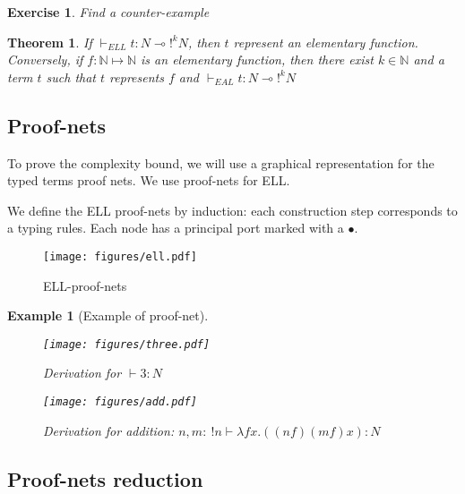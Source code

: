 \documentclass[a4paper,10pt]{article}
\newcommand{\limpl}{\multimap}  %
\newcommand{\Nset}{\mathbb{N}} %
\newtheorem{thm}{Theorem}
\newtheorem{ex}{Example}
\newtheorem{exo}{Exercise}
\begin{document}
\begin{exo}
Find a counter-example
\end{exo}

\begin{thm}
If $\vdash_{ELL} t:N \limpl !^{k} N$, then $t$ represent an elementary function.\\
Conversely, if $f: \Nset \mapsto \Nset$ is an elementary function, then there exist $k\in \Nset$ and a term $t$ such that $t$ represents $f$ and $\vdash_{EAL} t:N\limpl !^{k}N$
\end{thm}


\subsection{Proof-nets}

 To prove the complexity bound, we will use a graphical representation for the typed terms proof nets. We use proof-nets for ELL.



 We define the ELL proof-nets by induction: each construction step corresponds to a typing rules. Each node has a principal port marked with a $\bullet$.

\begin{figure}[h]
	\begin{center}
		\texttt{[image: figures/ell.pdf]}
		\caption{ELL-proof-nets}
	\end{center}	
\end{figure}

\begin{ex}[Example of proof-net]

\begin{figure}[h]
   \begin{minipage}[c]{.46\linewidth}
      \texttt{[image: figures/three.pdf]}
      \caption{Derivation for $\vdash 3:N$}
   \end{minipage} \hfill
   \begin{minipage}[c]{.46\linewidth}
      \texttt{[image: figures/add.pdf]}
      \caption{Derivation for addition: $n,m:\ !n \vdash \lambda f x. ((n f) (m f) x): N$}
   \end{minipage}
\end{figure}

\end{ex}


\subsection{Proof-nets reduction}
\end{document}
